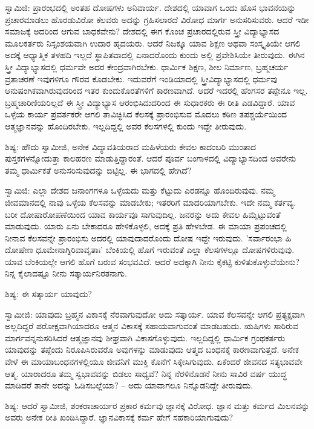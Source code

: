 ಸ್ವಾಮಿಜಿ: ಪ್ರಾರಂಭದಲ್ಲಿ ಅಂತಹ ದೋಷಗಳು ಅನಿವಾರ್ಯ. ದೇಶದಲ್ಲಿ ಯಾವಾಗ ಒಂದು ಹೊಸ ಭಾವನೆಯನ್ನು ಪ್ರಚಾರಮಾಡಲು ಹೊರಡುವಿರೋ ಕೆಲವರು ಅದನ್ನು ಗ್ರಹಿಸಲಾರದೆ ವಿರೋಧ ಮಾರ್ಗ ಅನುಸರಿಸುವರು. ಆದರೆ ಇಡೀ ಸಮಾಜಕ್ಕೆ ಅದರಿಂದ ಆಗುವ ಬಾಧಕವೇನು? ದೇಶದಲ್ಲಿ ಈಗ ಕೊಂಚ ಪ್ರಚಾರದಲ್ಲಿರುವ ಸ್ತ್ರೀ ವಿದ್ಯಾಭ್ಯಾಸದ ಮೂಲಕರ್ತರು ನಿಸ್ಸಂಶಯವಾಗಿ ಉದಾರ ಹೃದಯರು. ಆದರೆ ನಿಜಕ್ಕೂ ಯಾವ ಶಿಕ್ಷಣ ಅಥವಾ ಸಂಸ್ಕೃತಿಯೇ ಆಗಲಿ ಅದಕ್ಕೆ ಆಧ್ಯಾತ್ಮಿಕ ತಳಹದಿ ಇಲ್ಲದೆ ಸ್ಥಾಪಿತವಾದಲ್ಲಿ ಏನಾದರೊಂದು ಕುಂದು ಅಲ್ಲಿ ಪ್ರವೇಶಿಸಿಯೇ ತೀರುವುದು. ಈಗಿನ ಸ್ತ್ರೀ ವಿದ್ಯಾಭ್ಯಾಸದಲ್ಲಿ ಧರ್ಮವೇ ಅದರ ಕೇಂದ್ರವಾಗಿರಬೇಕು. ಧಾರ್ಮಿಕ ಶಿಕ್ಷಣ, ಶೀಲ ನಿರ್ಮಾಣ, ಬ್ರಹ್ಮಚರ್ಯ ವ್ರತಾಚರಣೆ ಇವುಗಳಿಗೂ ಗೌರವ ಕೊಡಬೇಕು. ಇದುವರೆಗೆ ಇಂಡಿಯಾದಲ್ಲಿ ಸ್ತ್ರೀವಿದ್ಯಾಭ್ಯಾಸದಲ್ಲಿ ಧರ್ಮವು ಆನುಷಂಗಿಕವಾಗಿರುವುದರಿಂದ ಇತರ ಕುಂದುಕೊರತೆಗಳಿಗೆ ಕಾರಣವಾಗಿದೆ. ಆದರೆ ಇದರಲ್ಲಿ ಹೆಂಗಸರ ತಪ್ಪೇನೂ ಇಲ್ಲ. ಬ್ರಹ್ಮಚಾರಿಣಿಯರಿಲ್ಲದೆ ಈ ಸ್ತ್ರೀ ವಿದ್ಯಾಭ್ಯಾಸ ಆರಂಭಿಸಿದುದರಿಂದ ಈ ಸುಧಾರಕರು ಈ ರೀತಿ ಎಡವಿದ್ದಾರೆ. ಯಾವ ಒಳ್ಳೆಯ ಕಾರ್ಯ ಪ್ರವರ್ತಕರೇ ಆಗಲಿ ತಾವಿಚ್ಛಿಸಿದ ಕೆಲಸಕ್ಕೆ ಪ್ರಾರಂಭಿಸುವ ಮೊದಲು ಕಠಿಣ ತಪಶ್ಚರ್ಯೆಯಿಂದ ಆತ್ಮಜ್ಞಾನವನ್ನು ಹೊಂದಿರಬೇಕು. ಇಲ್ಲದಿದ್ದಲ್ಲಿ ಅವರ ಕೆಲಸಗಳಲ್ಲಿ ಕುಂದು ಇದ್ದೇ ತೀರುವುದು.

ಶಿಷ್ಯ: ಹೌದು ಸ್ವಾಮೀಜಿ, ಅನೇಕ ವಿದ್ಯಾವತಿಯರಾದ ಮಹಿಳೆಯರು ಕೇವಲ ಕಾದಂಬರಿ ಮುಂತಾದ ಪುಸ್ತಕಗಳನ್ನೋದುತ್ತಾ ಕಾಲಹರಣ ಮಾಡುತ್ತಿದ್ದಾರಂತೆ. ಆದರೆ ಪೂರ್ವ ಬಂಗಾಳದಲ್ಲಿ ವಿದ್ಯಾಭ್ಯಾಸದಿಂದ ಅವರೇನು ತಮ್ಮ ಧಾರ್ಮಿಕತೆ ಅನುಸರಿಸುವುದನ್ನು ಬಿಟ್ಟಿಲ್ಲ. ಈ ಭಾಗದಲ್ಲಿ ಹೇಗಿದೆ?

ಸ್ವಾಮಿಜಿ: ಎಲ್ಲಾ ದೇಶದ ಜನಾಂಗಗಳೂ ಒಳ್ಳೆಯದು ಮತ್ತು ಕೆಟ್ಟುದು ಎರಡನ್ನೂ ಹೊಂದಿರುವುವು. ನಮ್ಮ ಜೀವಮಾನದಲ್ಲಿ ನಾವು ಒಳ್ಳೆಯ ಕೆಲಸವನ್ನು ಮಾಡಬೇಕು; ಇತರರಿಗೆ ಮಾದರಿಯಾಗಬೇಕು. ಇದೇ ನಮ್ಮ ಕರ್ತವ್ಯ. ಬರೀ ದೋಷಾರೋಪಣೆಯಿಂದ ಯಾವ ಕಾರ್ಯವೂ ಸಾಗುವುದಿಲ್ಲ. ಜನರನ್ನು ಅದು ಕೇವಲ ಹಿಮ್ಮೆಟ್ಟುವಂತೆ ಮಾಡುವುದು. ಯಾರು ಏನು ಬೇಕಾದರೂ ಹೇಳಿಕೊಳ್ಳಲಿ, ಅದಕ್ಕೆ ಪ್ರತಿ ಹೇಳಬೇಡ. ಈ ಮಾಯಾ ಪ್ರಪಂಚದಲ್ಲಿ ನೀನಾವ ಕೆಲಸವನ್ನೇ ಪ್ರಾರಂಭಿಸು ಅದರಲ್ಲಿ ಯಾವುದಾದರೊಂದು ದೋಷ ಇದ್ದೇ ಇರುವುದು. 'ಸರ್ವಾರಂಭಾ ಹಿ ದೋಷೇಣ ಧೂಮೇನಾಗ್ನಿರಿವಾವೃತಾಃ' ಬೆಂಕಿಯಲ್ಲಿ ಹೊಗೆ ಇರುವಂತೆ ಎಲ್ಲಾ ಕೆಲಸಗಳಲ್ಲೂ ದೋಷಗಳಿರುವುವು. ಯಾವ ಬೆಂಕಿಯಲ್ಲೇ ಆಗಲಿ ಹೊಗೆ ಬರುವ ಸಂಭವವಿದೆ. ಆದರೆ ಅದಕ್ಕಾಗಿ ನೀನು ಕೈಕಟ್ಟಿ ಕುಳಿತುಕೊಳ್ಳುವೆಯೇನು? ನಿನ್ನ ಕೈಲಾದಷ್ಟೂ ನೀನು ಸತ್ಕಾರ್ಯನಿರತನಾಗು.

ಶಿಷ್ಯ: ಈ ಸತ್ಕಾರ್ಯ ಯಾವುದು?

ಸ್ವಾಮೀಜಿ: ಯಾವುದು ಬ್ರಹ್ಮನ ವಿಕಾಸಕ್ಕೆ ನೆರವಾಗುವುದೋ ಅದು ಸತ್ಕಾರ್ಯ. ಯಾವ ಕೆಲಸವನ್ನೇ ಆಗಲಿ ಪ್ರತ್ಯಕ್ಷವಾಗಿ ಅಲ್ಲದಿದ್ದರೆ ಪರೋಕ್ಷವಾಗಿಯಾದರೂ ಆತ್ಮನ ವಿಕಾಸಕ್ಕೆ ಸಹಾಯವಾಗುವಂತೆ ಮಾಡಬಹುದು. ಋಷಿಗಳು ಸಾರಿರುವ ಮಾರ್ಗವನ್ನನುಸರಿಸಿದರೆ ಆತ್ಮಜ್ಞಾನವು ಶೀಘ್ರವಾಗಿ ವಿಕಾಸಗೊಳ್ಳುವುದು. ಇಲ್ಲದಿದ್ದಲ್ಲಿ ಧಾರ್ಮಿಕ ಗ್ರಂಥಕರ್ತರು ಯಾವುದನ್ನು ತಪ್ಪೆಂದು ನಿರೂಪಿಸಿರುವರೊ ಅವುಗಳನ್ನು ಮಾಡುವುದು ಆತ್ಮದ ಬಂಧನಕ್ಕೆ ಕಾರಣವಾಗುತ್ತದೆ. ಅನೇಕ ವೇಳೆ ಈ ಮಾಯಾಬಂಧನಗಳಲ್ಲಿಯೂ ಜೀವನಿಗೆ ಮುಕ್ತಿ ಕೊನೆಗೆ ಸಿಕ್ಕೇಸಿಗುವುದು. ಏಕೆಂದರೆ ಜೀವನದ ಸತ್ಯಭಾವವೇ ಆತ್ಮ. ಯಾರಾದರೂ ತಮ್ಮ ಸ್ವಭಾವವನ್ನು ಬಿಡಲು ಸಾಧ್ಯವೆ? ನಿನ್ನ ನೆರಳಿನೊಡನೆ ನೀನು ಸಾವಿರ ವರ್ಷ ಯುದ್ಧ ಮಾಡಿದರೆ ತಾನೇ ಅದನ್ನು ಓಡಿಸಬಲ್ಲೆಯಾ? – ಅದು ಯಾವಾಗಲೂ ನಿನ್ನೊಡನಿದ್ದೇ ತೀರುವುದು.

ಶಿಷ್ಯ: ಆದರೆ ಸ್ವಾಮೀಜಿ, ಶಂಕರಾಚಾರ್ಯರ ಪ್ರಕಾರ ಕರ್ಮವು ಜ್ಞಾನಕ್ಕೆ ವಿರೋಧ. ಜ್ಞಾನ ಮತ್ತು ಕರ್ಮದ ಮಿಲನವನ್ನು ಅವರು ಅನೇಕ ರೀತಿ ಖಂಡಿಸಿದ್ದಾರೆ. ಜ್ಞಾನವಿಕಾಸಕ್ಕೆ ಕರ್ಮ ಹೇಗೆ ಸಹಕಾರಿಯಾಗುವುದು?

